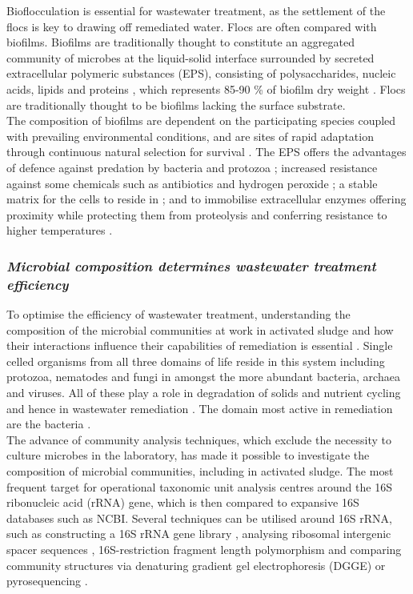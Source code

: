 \documentclass[11pt]{article}
\begin{document}
Bioflocculation is essential for wastewater treatment, as the settlement of the flocs is key to drawing off remediated water. Flocs are often compared with biofilms. Biofilms are traditionally thought to constitute an aggregated community of microbes at the liquid-solid interface surrounded by secreted extracellular polymeric substances (EPS), consisting of polysaccharides, nucleic acids, lipids and proteins \cite{wingender1999}, which represents 85-90 \% of biofilm dry weight \cite{Frolund_96}. Flocs are traditionally thought to be biofilms lacking the surface substrate.\\


The composition of biofilms are dependent on the participating species coupled with prevailing environmental conditions, and are sites of rapid adaptation through continuous natural selection for survival \cite{boles2008,matz2005,palmer2001}.  
The EPS offers the advantages of defence against predation by bacteria \cite{rao2005} and protozoa \cite{matz2005}; increased resistance against some chemicals such as antibiotics and hydrogen peroxide \cite{burmolle_06}; a stable matrix for the cells to reside in \cite{Flemming_10}; and to immobilise extracellular enzymes offering proximity while protecting them from proteolysis and conferring resistance to higher temperatures \cite{wingender2002extracellular,Flemming_10,skillman1998}.\\

\subsubsection{\emph{Microbial composition determines wastewater treatment efficiency}}
To optimise the efficiency of wastewater treatment, understanding the composition of the microbial communities at work in activated sludge and how their interactions influence their capabilities of remediation is essential \cite{daims2006}.
Single celled organisms from all three domains of life reside in this system including protozoa, nematodes and fungi in amongst the more abundant bacteria, archaea and viruses. All of these play a role in degradation of solids and nutrient cycling and hence in wastewater remediation \cite{muchie2010bioremediation}. The domain most active in remediation are the bacteria \cite{spellman2008handbook}.\\


The advance of community analysis techniques, which exclude the necessity to culture microbes in the laboratory, has made it possible to investigate the composition of microbial communities, including in activated sludge. The most frequent target for operational taxonomic unit analysis centres around the 16S ribonucleic acid (rRNA) gene, which is then compared to expansive 16S databases such as NCBI. Several techniques can be utilised around 16S rRNA, such as constructing a 16S rRNA gene library \cite{McGarvey_04}, analysing ribosomal intergenic spacer sequences \cite{Yu_01}, 16S-restriction fragment length polymorphism \cite{Gilbride_06} and comparing community structures via denaturing gradient gel electrophoresis (DGGE) \cite{Hesham_11} or pyrosequencing \cite{wang2012pyrosequencing}.\\
\end{document}
